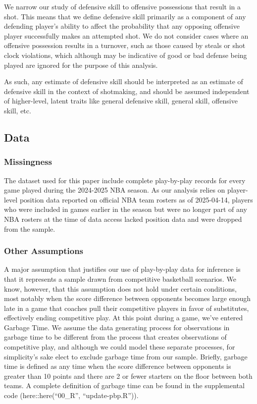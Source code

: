\documentclass[
  letterpaper,
  DIV=11,
  numbers=noendperiod]{scrartcl}
\begin{document}
We narrow our study of defensive skill to offensive possessions that
result in a shot. This means that we define defensive skill primarily as
a component of any defending player's ability to affect the probability
that any opposing offensive player successfully makes an attempted shot.
We do not consider cases where an offensive possession results in a
turnover, such as those caused by steals or shot clock violations, which
although may be indicative of good or bad defense being played are
ignored for the purpose of this analysis.

As such, any estimate of defensive skill should be interpreted as an
estimate of defensive skill in the context of shotmaking, and should be
assumed independent of higher-level, latent traits like general
defensive skill, general skill, offensive skill, etc.

\subsection{Data}\label{data}

\subsubsection{Missingness}\label{missingness}

The dataset used for this paper include complete play-by-play records
for every game played during the 2024-2025 NBA season. As our analysis
relies on player-level position data reported on official NBA team
rosters as of 2025-04-14, players who were included in games earlier in
the season but were no longer part of any NBA rosters at the time of
data access lacked position data and were dropped from the sample.

\subsubsection{Other Assumptions}\label{other-assumptions}

A major assumption that justifies our use of play-by-play data for
inference is that it represents a sample drawn from competitive
basketball scenarios. We know, however, that this assumption does not
hold under certain conditions, most notably when the score difference
between opponents becomes large enough late in a game that coaches pull
their competitive players in favor of substitutes, effectively ending
competitive play. At this point during a game, we've entered Garbage
Time. We assume the data generating process for observations in garbage
time to be different from the process that creates observations of
competitive play, and although we could model these separate processes,
for simplicity's sake elect to exclude garbage time from our sample.
Briefly, garbage time is defined as any time when the score difference
between opponents is greater than 10 points and there are 2 or fewer
starters on the floor between both teams. A complete definition of
garbage time can be found in the supplemental code
(here::here(``00\_R'', ``update-pbp.R'')).
\end{document}
